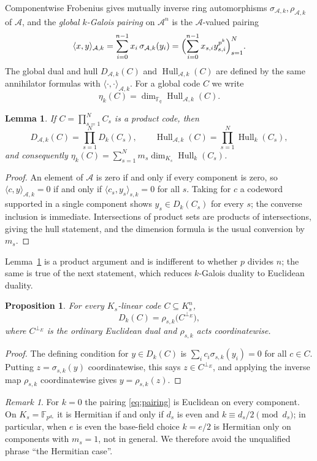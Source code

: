 \documentclass[11pt,a4paper]{article}
\newcommand{\F}{\mathbb F}
\newcommand{\A}{\mathcal A}
\newcommand{\Hull}{\operatorname{Hull}}
\newcommand{\Dk}{D_k}
\newcommand{\perpE}{\perp_{E}}
\numberwithin{equation}{section}
\theoremstyle{plain}
\newtheorem{lemma}[theorem]{Lemma}
\newtheorem{proposition}[theorem]{Proposition}
\theoremstyle{definition}
\theoremstyle{remark}
\newtheorem{remark}[theorem]{Remark}
\begin{document}
Componentwise Frobenius gives mutually inverse ring automorphisms
$\sigma_{\A,k},\rho_{\A,k}$ of $\A$, and the \emph{global $k$-Galois pairing} on
$\A^n$ is the $\A$-valued pairing
\[
\langle x,y\rangle_{\A,k}
   =\sum_{i=0}^{n-1}x_i\,\sigma_{\A,k}(y_i)
   =\Bigl(\sum_{i=0}^{n-1}x_{s,i}y_{s,i}^{p^k}\Bigr)_{s=1}^{N}.
\]
The global dual and hull $D_{\A,k}(C)$ and $\Hull_{\A,k}(C)$ are defined by the
same annihilator formulas with $\langle\cdot,\cdot\rangle_{\A,k}$.  For a
global code $C$ we write
\[
\eta_k(C)=\dim_{\F_q}\Hull_{\A,k}(C).
\]

\begin{lemma}\label{lem:global-duality}
If $C=\prod_{s=1}^{N}C_s$ is a product code, then
\[
D_{\A,k}(C)=\prod_{s=1}^{N}\Dk(C_s),
\qquad
\Hull_{\A,k}(C)=\prod_{s=1}^{N}\Hull_k(C_s),
\]
and consequently
$\eta_k(C)=\sum_{s=1}^{N}m_s\dim_{K_s}\Hull_k(C_s)$.
\end{lemma}

\begin{proof}
An element of $\A$ is zero if and only if every component is zero, so
$\langle c,y\rangle_{\A,k}=0$ if and only if
$\langle c_s,y_s\rangle_{s,k}=0$ for all $s$.  Taking for $c$ a codeword
supported in a single component shows $y_s\in\Dk(C_s)$ for every $s$; the
converse inclusion is immediate.  Intersections of product sets are products of
intersections, giving the hull statement, and the dimension formula is the
usual conversion by $m_s$.
\end{proof}

Lemma~\ref{lem:global-duality} is a product argument and is indifferent to
whether $p$ divides $n$; the same is true of the next statement, which reduces
$k$-Galois duality to Euclidean duality.

\begin{proposition}\label{prop:dual-translation}
For every $K_s$-linear code $C\subseteq K_s^n$,
\[
\Dk(C)=\rho_{s,k}\bigl(C^{\perpE}\bigr),
\]
where $C^{\perpE}$ is the ordinary Euclidean dual and $\rho_{s,k}$ acts
coordinatewise.
\end{proposition}

\begin{proof}
The defining condition for $y\in\Dk(C)$ is
$\sum_i c_i\sigma_{s,k}(y_i)=0$ for all $c\in C$.  Putting
$z=\sigma_{s,k}(y)$ coordinatewise, this says $z\in C^{\perpE}$, and applying
the inverse map $\rho_{s,k}$ coordinatewise gives $y=\rho_{s,k}(z)$.
\end{proof}

\begin{remark}\label{rem:euclidean-hermitian}
For $k=0$ the pairing \eqref{eq:pairing} is Euclidean on every component.  On
$K_s=\F_{p^{d_s}}$ it is Hermitian if and only if $d_s$ is even and
$k\equiv d_s/2\pmod{d_s}$; in particular, when $e$ is even the base-field
choice $k=e/2$ is Hermitian only on components with $m_s=1$, not in general.
We therefore avoid the unqualified phrase ``the Hermitian case''.
\end{remark}
\end{document}

